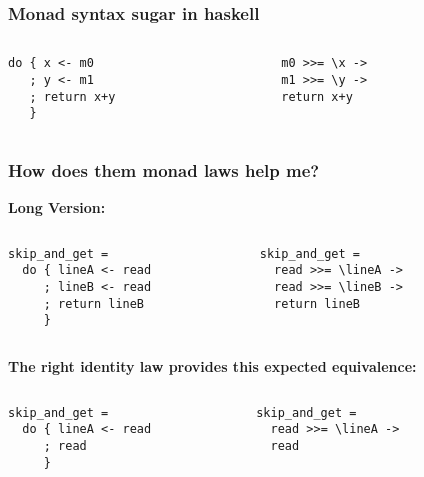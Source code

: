\documentclass{beamer}
\begin{document}
\begin{frame}[fragile]
\frametitle{Monad syntax sugar in haskell}
\begin{columns}[t]
  \begin{column}{5cm}
\begin{lstlisting}
do { x <- m0
   ; y <- m1
   ; return x+y
   }
\end{lstlisting}
  \end{column}
  \begin{column}{5cm}
\begin{lstlisting}
    m0 >>= \x ->    
    m1 >>= \y ->    
    return x+y
\end{lstlisting}
  \end{column}
\end{columns}



\end{frame}
\begin{frame}[fragile]
\frametitle{How does them monad laws help me?}		
\textbf{Long Version:}
\vspace{-0.5cm}
\begin{columns}[t]
  \begin{column}{5cm}
\begin{lstlisting}
skip_and_get = 
  do { lineA <- read
     ; lineB <- read 
     ; return lineB 
     }
\end{lstlisting}
  \end{column}
  \begin{column}{5cm}
\begin{lstlisting}
skip_and_get =
  read >>= \lineA ->    
  read >>= \lineB ->    
  return lineB
\end{lstlisting}
  \end{column}
\end{columns}
\pause
\textbf{The right identity law provides this expected equivalence:} 
\vspace{-0.5cm}
\begin{columns}[t]
  \begin{column}{5cm}
\begin{lstlisting}
skip_and_get = 
  do { lineA <- read
     ; read
     }
\end{lstlisting}
  \end{column}
  \begin{column}{5cm}
\begin{lstlisting}
skip_and_get =
  read >>= \lineA ->    
  read
\end{lstlisting}
  \end{column}
\end{columns}
\end{frame}
\end{document}
